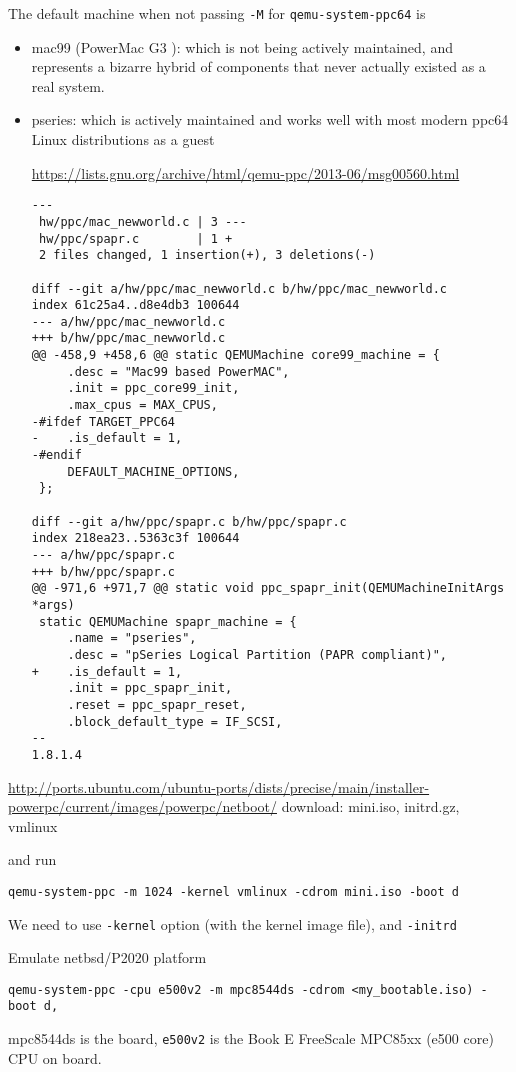 The default machine when not passing \verb!-M! for \verb!qemu-system-ppc64! is
\begin{itemize}
  \item mac99 (PowerMac G3 ): which is not being actively maintained, and represents a
bizarre hybrid of components that never actually existed as a real system.
 
  \item pseries: which is actively maintained and works well with most modern
  ppc64 Linux distributions as a guest
  
  \url{https://lists.gnu.org/archive/html/qemu-ppc/2013-06/msg00560.html}

{\footnotesize  
\begin{verbatim}
---
 hw/ppc/mac_newworld.c | 3 ---
 hw/ppc/spapr.c        | 1 +
 2 files changed, 1 insertion(+), 3 deletions(-)

diff --git a/hw/ppc/mac_newworld.c b/hw/ppc/mac_newworld.c
index 61c25a4..d8e4db3 100644
--- a/hw/ppc/mac_newworld.c
+++ b/hw/ppc/mac_newworld.c
@@ -458,9 +458,6 @@ static QEMUMachine core99_machine = {
     .desc = "Mac99 based PowerMAC",
     .init = ppc_core99_init,
     .max_cpus = MAX_CPUS,
-#ifdef TARGET_PPC64
-    .is_default = 1,
-#endif
     DEFAULT_MACHINE_OPTIONS,
 };
 
diff --git a/hw/ppc/spapr.c b/hw/ppc/spapr.c
index 218ea23..5363c3f 100644
--- a/hw/ppc/spapr.c
+++ b/hw/ppc/spapr.c
@@ -971,6 +971,7 @@ static void ppc_spapr_init(QEMUMachineInitArgs *args)
 static QEMUMachine spapr_machine = {
     .name = "pseries",
     .desc = "pSeries Logical Partition (PAPR compliant)",
+    .is_default = 1,
     .init = ppc_spapr_init,
     .reset = ppc_spapr_reset,
     .block_default_type = IF_SCSI,
-- 
1.8.1.4
\end{verbatim}
}
\end{itemize}


\url{http://ports.ubuntu.com/ubuntu-ports/dists/precise/main/installer-powerpc/current/images/powerpc/netboot/}
download: mini.iso, initrd.gz, vmlinux

and run
\begin{verbatim}
qemu-system-ppc -m 1024 -kernel vmlinux -cdrom mini.iso -boot d
\end{verbatim}
We need to use \verb!-kernel! option (with the kernel image file), and 
\verb!-initrd! 


Emulate netbsd/P2020 platform
\begin{verbatim}
qemu-system-ppc -cpu e500v2 -m mpc8544ds -cdrom <my_bootable.iso) -boot d,
\end{verbatim}
mpc8544ds is the board, \verb!e500v2! is the Book E FreeScale MPC85xx (e500
core) CPU on board.

